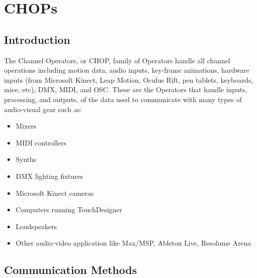 \cleardoublepage
\chapter{CHOPs}
\label{ch:4}


\section{Introduction}

\begin{fullwidth}
The Channel Operators, or CHOP, family of Operators handle all channel operations including motion data, audio inputs, key-frame animations, hardware inputs (from Microsoft Kinect, Leap Motion, Oculus Rift, pen tablets, keyboards, mice, etc), DMX, MIDI, and OSC. These are the Operators that handle inputs, processing, and outputs, of the data used to communicate with many types of audio-visual gear such as:

\begin{itemize}
\item Mixers
\item MIDI controllers
\item Synths
\item DMX lighting fixtures
\item Microsoft Kinect cameras
\item Computers running TouchDesigner
\item Loudspeakers
\item Other audio-video application like Max/MSP, Ableton Live, Resolume Arena
\end{itemize}

\end{fullwidth}


\section{Communication Methods}


